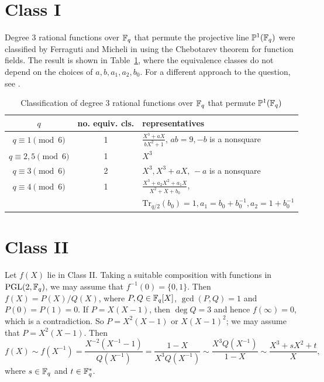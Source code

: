 \documentclass{amsart}
\numberwithin{equation}{section}
\theoremstyle{definition}
\newcommand{\f}{\Bbb F}
\newcommand{\pgl}{\mathrm{PGL}}
\begin{document}
\section{Class I}

Degree 3 rational functions over $\f_q$ that permute the projective line $\Bbb P^1(\f_q)$ were classified by Ferraguti and Micheli in \cite{Ferraguti-Micheli-DCC-2020} using the Chebotarev theorem for function fields. The result is shown in Table~\ref{tb1}, where  the equivalence classes do not depend on the choices of $a,b,a_1,a_2,b_0$. For a different approach to the question, see \cite{Hou-CC-2021}.

\begin{table}[h]
\caption{Classification of degree 3 rational functions over $\f_q$ that permute $\Bbb P^1(\f_q)$}\label{tb1}
   \renewcommand*{\arraystretch}{1.4}
    \centering
     \begin{tabular}{ccl}
         \hline
         $q$ & no. equiv. cls. & \hfil representatives\\ \hline
         $q\equiv 1\pmod 6$ & 1 & $\displaystyle\frac{X^3+aX}{bX^2+1},\,ab=9, -b$ is
         a nonsquare\\
         $q\equiv 2,5\pmod 6$ & 1 & $X^3$\\
         $q\equiv 3\pmod 6$ & 2 & $X^3, X^3+aX,\, -a$ is a nonsquare\\
         $q\equiv 4\pmod 6$ & 1 & $\displaystyle\frac{X^3+a_2X^2+a_1X}{X^2+X+b_0}$,\\
         && $\text{Tr}_{q/2}(b_0)=1, a_1=b_0+b_0^{-1}, a_2=1+b_0^{-1}$\\
         \hline
     \end{tabular}
\end{table}


\section{Class II}

Let $f(X)$ lie in Class II. Taking a suitable composition with functions in $\pgl(2,\f_q)$, we may assume that $f^{-1}(0) = \{0, 1\}$.
Then $f(X)=P(X)/Q(X)$, where $P,Q\in \f_q[X]$, $\gcd(P,Q)=1$ and $P(0)=P(1)=0$. If $P=X(X-1)$, then $\deg Q=3$ and hence $f(\infty)=0$, which is a contradiction. So $P=X^2(X-1)$ or $X(X-1)^2$; we may assume that $P=X^2(X-1)$. Then
\[
f(X)\sim f(X^{-1})=\frac{X^{-2}(X^{-1}-1)}{Q(X^{-1})}=\frac{1-X}{X^3Q(X^{-1})}\sim\frac{X^3Q(X^{-1})}{1-X}\sim\frac{X^3+sX^2+t}X,
\]
where $s\in\f_q$ and $t\in\f_q^*$.
\end{document}

